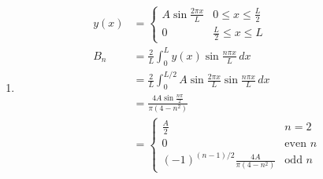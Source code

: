 \documentclass{article}
\begin{document}
\begin{enumerate}
  \item

        \begin{align*}
          y(x) & = \begin{cases}
                     A \sin \frac{2 \pi x}{L} & 0 \le x \le \frac{L}{2} \\
                     0                        & \frac{L}{2} \le x \le L
                   \end{cases}                              \\
          B_n  & = \frac{2}{L} \int_0^L y(x) \sin \frac{n \pi x}{L} \,dx                           \\
               & = \frac{2}{L} \int_0^{L / 2} A \sin \frac{2 \pi x}{L} \sin \frac{n \pi x}{L} \,dx \\
               & = \frac{4 A \sin \frac{n \pi}{2}}{\pi (4 - n^2)}                                  \\
               & = \begin{cases}
                     \frac{A}{2}                                  & n = 2          \\
                     0                                            & \text{even } n \\
                     (-1)^{(n - 1) / 2} \frac{4 A}{\pi (4 - n^2)} & \text{odd } n
                   \end{cases}
        \end{align*}
\end{enumerate}
\end{document}
